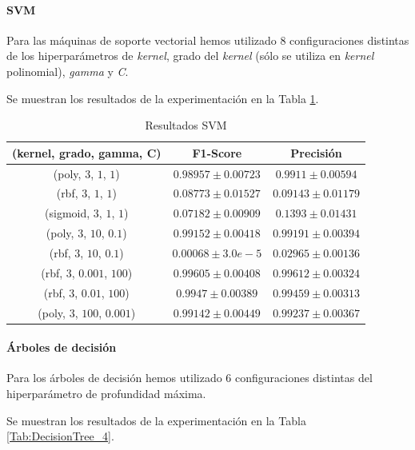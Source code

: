 \documentclass[12pt]{article}
\begin{document}
\paragraph{SVM}

Para las máquinas de soporte vectorial hemos utilizado 8 configuraciones distintas de los hiperparámetros de \textit{kernel},
grado del \textit{kernel} (sólo se utiliza en \textit{kernel} polinomial), \textit{gamma} y \textit{C}.

Se muestran los resultados de la experimentación en la Tabla \ref{Tab:SVM_4}.

\begin{table}[!ht]
	\caption{Resultados SVM}
	\centering
		 \begin{tabular}{||c c c||}
			\hline 
			(kernel, grado, gamma, C) & F1-Score & Precisión  \\ [0.5ex]  
			\hline\hline
			(poly, $3$, $1$, $1$) & $0.98957 \pm 0.00723$ & $0.9911 \pm 0.00594$ \\
			\hline 
			(rbf, $3$, $1$, $1$) & $0.08773 \pm 0.01527$ & $0.09143 \pm 0.01179$ \\
			\hline 
			(sigmoid, $3$, $1$, $1$) & $0.07182 \pm 0.00909$ & $0.1393 \pm 0.01431$ \\
			\hline 
			(poly, $3$, $10$, $0.1$) & $0.99152 \pm 0.00418$ & $0.99191 \pm 0.00394$ \\
			\hline 
			(rbf, $3$, $10$, $0.1$) & $0.00068 \pm 3.0e-5$ & $0.02965 \pm 0.00136$ \\
			\hline 
			(rbf, $3$, $0.001$, $100$) & $0.99605 \pm 0.00408$ & $0.99612 \pm 0.00324$ \\
			\hline 
			(rbf, $3$, $0.01$, $100$) & $0.9947 \pm 0.00389$ & $0.99459 \pm 0.00313$ \\
			\hline 
			(poly, $3$, $100$, $0.001$) & $0.99142 \pm 0.00449$ & $0.99237 \pm 0.00367$ \\
			\hline 
		 \end{tabular}
	\label{Tab:SVM_4}
	\end{table}

\paragraph{Árboles de decisión}
Para los árboles de decisión hemos utilizado 6 configuraciones distintas del hiperparámetro de profundidad máxima.

Se muestran los resultados de la experimentación en la Tabla \ref{Tab:DecisionTree_4}.
\end{document}
